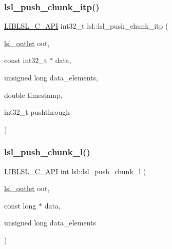 \subsubsection{\texorpdfstring{lsl\+\_\+push\+\_\+chunk\+\_\+itp()}{lsl\_push\_chunk\_itp()}}
{\footnotesize\ttfamily \hyperlink{lsl__cpp_8h_aafd0ef1813e8be84a1420c4f1df64615}{L\+I\+B\+L\+S\+L\+\_\+\+C\+\_\+\+A\+PI} int32\+\_\+t lsl\+::lsl\+\_\+push\+\_\+chunk\+\_\+itp (\begin{DoxyParamCaption}\item[{\hyperlink{namespacelsl_abcf512b0f66dacf86c10b165995fd50b}{lsl\+\_\+outlet}}]{out,  }\item[{const int32\+\_\+t $\ast$}]{data,  }\item[{unsigned long}]{data\+\_\+elements,  }\item[{double}]{timestamp,  }\item[{int32\+\_\+t}]{pushthrough }\end{DoxyParamCaption})}

\mbox{\label{namespacelsl_a68403934d1fdace37348c95f54367bc2}} 
\subsubsection{\texorpdfstring{lsl\+\_\+push\+\_\+chunk\+\_\+l()}{lsl\_push\_chunk\_l()}}
{\footnotesize\ttfamily \hyperlink{lsl__cpp_8h_aafd0ef1813e8be84a1420c4f1df64615}{L\+I\+B\+L\+S\+L\+\_\+\+C\+\_\+\+A\+PI} int lsl\+::lsl\+\_\+push\+\_\+chunk\+\_\+l (\begin{DoxyParamCaption}\item[{\hyperlink{namespacelsl_abcf512b0f66dacf86c10b165995fd50b}{lsl\+\_\+outlet}}]{out,  }\item[{const long $\ast$}]{data,  }\item[{unsigned long}]{data\+\_\+elements }\end{DoxyParamCaption})}

\mbox{\label{namespacelsl_a55622b4fc53149f986414f7642baf00a}} 
